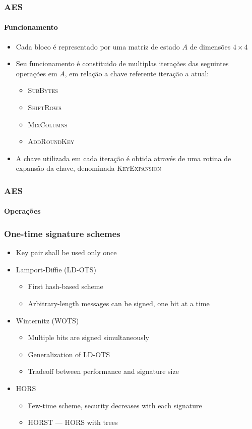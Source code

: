 \documentclass[12pt]{beamer}
\begin{document}
\begin{frame}
    \frametitle{AES}
    \framesubtitle{Funcionamento}
    \begin{itemize}
        \item Cada bloco é representado por uma matriz de estado $A$ de dimensões $4 \times 4$
        \item Seu funcionamento é constituido de multiplas iterações das seguintes operações em $A$, em relação a chave referente iteração a atual:
        \begin{itemize}
            \item\textsc{SubBytes}
            \item\textsc{ShiftRows}
            \item\textsc{MixColumns}
            \item\textsc{AddRoundKey}
        \end{itemize}
        \item A chave utilizada em cada iteração é obtida através de uma rotina de expansão da chave, denominada \textsc{KeyExpansion}
    \end{itemize}
\end{frame}

\begin{frame}
    \frametitle{AES}
    \framesubtitle{Operações}
    
\end{frame}

\begin{frame}
  \frametitle{One-time signature schemes}
  \begin{itemize}
    \item Key pair shall be used only once
    \item Lamport-Diffie (LD-OTS)
    \begin{itemize}
      \item First hash-based scheme
      \item Arbitrary-length messages can be signed, one bit at a time
    \end{itemize}
    \item Winternitz (WOTS)
    \begin{itemize}
      \item Multiple bits are signed simultaneously
      \item Generalization of LD-OTS
      \item Tradeoff between performance and signature size
    \end{itemize}
    \item HORS
    \begin{itemize}
      \item Few-time scheme, security decreases with each signature
      \item HORST --- HORS with trees
    \end{itemize}
  \end{itemize}
\end{frame}
\end{document}
